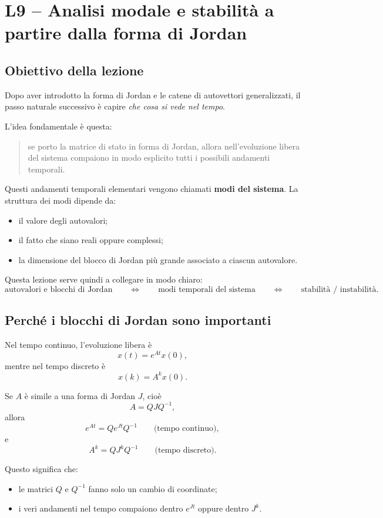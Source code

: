 \chapter{L9 -- Analisi modale e stabilità a partire dalla forma di Jordan}

\section{Obiettivo della lezione}

Dopo aver introdotto la forma di Jordan e le catene di autovettori generalizzati, il passo naturale successivo è capire \emph{che cosa si vede nel tempo}.

L'idea fondamentale è questa:

\begin{quote}
se porto la matrice di stato in forma di Jordan, allora nell'evoluzione libera del sistema compaiono in modo esplicito tutti i possibili andamenti temporali.
\end{quote}

Questi andamenti temporali elementari vengono chiamati \textbf{modi del sistema}.  
La struttura dei modi dipende da:
\begin{itemize}
    \item il valore degli autovalori;
    \item il fatto che siano reali oppure complessi;
    \item la dimensione del blocco di Jordan più grande associato a ciascun autovalore.
\end{itemize}

Questa lezione serve quindi a collegare in modo chiaro:
\[
\text{autovalori e blocchi di Jordan}
\qquad \Longleftrightarrow \qquad
\text{modi temporali del sistema}
\qquad \Longleftrightarrow \qquad
\text{stabilità / instabilità}.
\]

\section{Perché i blocchi di Jordan sono importanti}

Nel tempo continuo, l'evoluzione libera è
\[
x(t)=e^{At}x(0),
\]
mentre nel tempo discreto è
\[
x(k)=A^k x(0).
\]

Se $A$ è simile a una forma di Jordan $J$, cioè
\[
A=QJQ^{-1},
\]
allora
\[
e^{At}=Qe^{Jt}Q^{-1}
\qquad \text{(tempo continuo)},
\]
e
\[
A^k=QJ^kQ^{-1}
\qquad \text{(tempo discreto)}.
\]

Questo significa che:
\begin{itemize}
    \item le matrici $Q$ e $Q^{-1}$ fanno solo un cambio di coordinate;
    \item i veri andamenti nel tempo compaiono dentro $e^{Jt}$ oppure dentro $J^k$.
\end{itemize}

